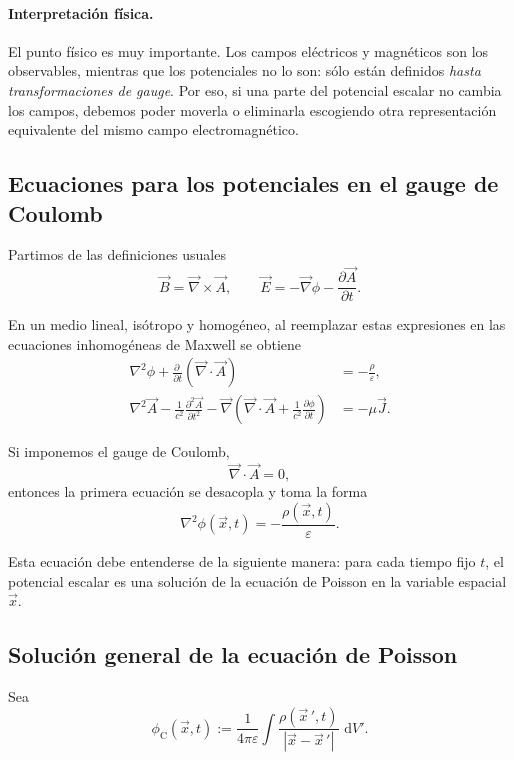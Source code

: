 \documentclass{article}
\numberwithin{equation}{section}
\newcommand{\dd}{\,\mathrm{d}}
\newcommand{\grad}{\vec\nabla}
\newcommand{\A}{\vec A}
\newcommand{\J}{\vec J}
\newcommand{\x}{\vec x}
\newcommand{\xp}{\vec x\,'}
\newcommand{\eps}{\varepsilon}
\begin{document}
\paragraph{Interpretación física.}
El punto físico es muy importante. Los campos eléctricos y magnéticos son los observables, mientras que los potenciales no lo son: sólo están definidos \emph{hasta transformaciones de gauge}. Por eso, si una parte del potencial escalar no cambia los campos, debemos poder moverla o eliminarla escogiendo otra representación equivalente del mismo campo electromagnético.


\subsection{Ecuaciones para los potenciales en el gauge de Coulomb}

Partimos de las definiciones usuales
\begin{equation}
\vec B=\grad\times\A,
\qquad
\vec E=-\grad\phi-\frac{\partial \A}{\partial t}.
\end{equation}

En un medio lineal, isótropo y homogéneo, al reemplazar estas expresiones en las ecuaciones inhomogéneas de Maxwell se obtiene
\begin{align}
\nabla^2\phi+\frac{\partial\ }{\partial t}(\grad\cdot\A)&=-\frac{\rho}{\eps},
\\
\nabla^2\A-\frac{1}{c^2}\frac{\partial^2\A}{\partial t^2}-\grad\left(\grad\cdot\A+\frac{1}{c^2}\frac{\partial\phi}{\partial t}\right)&=-\mu\J.
\end{align}

Si imponemos el gauge de Coulomb,
\begin{equation}
\grad\cdot\A=0,
\end{equation}
entonces la primera ecuación se desacopla y toma la forma
\begin{equation}\label{PoissonPhi}
\nabla^2\phi(\x,t)=-\frac{\rho(\x,t)}{\eps}.
\end{equation}

Esta ecuación debe entenderse de la siguiente manera: para cada tiempo fijo $t$, el potencial escalar es una solución de la ecuación de Poisson en la variable espacial $\x$.

\subsection{Solución general de la ecuación de Poisson}

Sea
\begin{equation}\label{phiCoulomb}
\phi_{\mathrm C}(\x,t):=\frac{1}{4\pi\eps}\int \frac{\rho(\xp,t)}{|\x-\xp|}\,\dd V'.
\end{equation}
\end{document}
